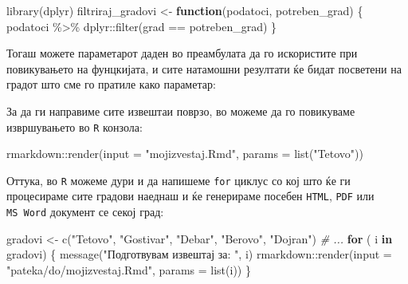 \documentclass[
]{book}
\newenvironment{Shaded}{\begin{snugshade}}{\end{snugshade}}
\newcommand{\AttributeTok}[1]{\textcolor[rgb]{0.77,0.63,0.00}{#1}}
\newcommand{\CommentTok}[1]{\textcolor[rgb]{0.56,0.35,0.01}{\textit{#1}}}
\newcommand{\ControlFlowTok}[1]{\textcolor[rgb]{0.13,0.29,0.53}{\textbf{#1}}}
\newcommand{\FunctionTok}[1]{\textcolor[rgb]{0.00,0.00,0.00}{#1}}
\newcommand{\NormalTok}[1]{#1}
\newcommand{\OtherTok}[1]{\textcolor[rgb]{0.56,0.35,0.01}{#1}}
\newcommand{\SpecialCharTok}[1]{\textcolor[rgb]{0.00,0.00,0.00}{#1}}
\newcommand{\StringTok}[1]{\textcolor[rgb]{0.31,0.60,0.02}{#1}}
\begin{document}
\begin{Shaded}
\begin{Highlighting}[]
\FunctionTok{library}\NormalTok{(dplyr)}
\NormalTok{filtriraj\_gradovi }\OtherTok{\textless{}{-}} \ControlFlowTok{function}\NormalTok{(podatoci, potreben\_grad) \{}
\NormalTok{  podatoci }\SpecialCharTok{\%\textgreater{}\%}\NormalTok{ dplyr}\SpecialCharTok{::}\FunctionTok{filter}\NormalTok{(grad }\SpecialCharTok{==}\NormalTok{ potreben\_grad)}
\NormalTok{\}}
\end{Highlighting}
\end{Shaded}

Тогаш можете параметарот даден во преамбулата да го искористите при повикувањето на фунцкијата, и сите натамошни резултати ќе бидат посветени на градот што сме го пратиле како параметар:

\begin{Shaded}
\end{Shaded}

За да ги направиме сите извештаи поврзо, во можеме да го повикуваме извршувањето во \texttt{R} конзола:

\begin{Shaded}
\begin{Highlighting}[]
\NormalTok{rmarkdown}\SpecialCharTok{::}\FunctionTok{render}\NormalTok{(}\AttributeTok{input =} \StringTok{"mojizvestaj.Rmd"}\NormalTok{, }\AttributeTok{params =} \FunctionTok{list}\NormalTok{(}\StringTok{"Tetovo"}\NormalTok{))}
\end{Highlighting}
\end{Shaded}

Оттука, во \texttt{R} можеме дури и да напишеме \texttt{for} циклус со кој што ќе ги процесираме сите градови наеднаш и ќе генерираме посебен \texttt{HTML}, \texttt{PDF} или \texttt{MS\ Word} документ се секој град:

\begin{Shaded}
\begin{Highlighting}[]
\NormalTok{gradovi }\OtherTok{\textless{}{-}} \FunctionTok{c}\NormalTok{(}\StringTok{"Tetovo"}\NormalTok{, }\StringTok{"Gostivar"}\NormalTok{, }\StringTok{"Debar"}\NormalTok{, }\StringTok{"Berovo"}\NormalTok{, }\StringTok{"Dojran"}\NormalTok{) }\CommentTok{\# ...}
\ControlFlowTok{for}\NormalTok{ ( i }\ControlFlowTok{in}\NormalTok{ gradovi) \{}
  \FunctionTok{message}\NormalTok{(}\StringTok{"Подготвувам извештај за: "}\NormalTok{, i)}
\NormalTok{  rmarkdown}\SpecialCharTok{::}\FunctionTok{render}\NormalTok{(}\AttributeTok{input =} \StringTok{"pateka/do/mojizvestaj.Rmd"}\NormalTok{, }\AttributeTok{params =} \FunctionTok{list}\NormalTok{(i))}
\NormalTok{\}}
\end{Highlighting}
\end{Shaded}
\end{document}
